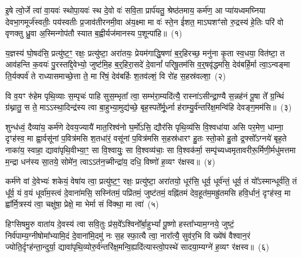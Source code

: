 \label{sec:startkanda1}
\setcounter{anuvakam}{0}
इ॒षे त्वो॒र्जे त्वा॑ वा॒यवः॑ स्थोपा॒यवः॑ स्थ दे॒वो वः॑ सवि॒ता प्रार्प॑यतु॒ श्रेष्ठ॑तमाय॒ कर्म॑ण॒ आ प्या॑यध्वमघ्निया देवभा॒गमूर्ज॑स्वतीः॒ पय॑स्वतीः प्र॒जाव॑तीरनमी॒वा अ॑य॒क्ष्मा मा वः॑ स्ते॒न ई॑शत॒ मा\-ऽघशꣳ॑सो रु॒द्रस्य॑ हे॒तिः परि॑ वो वृणक्तु ध्रु॒वा अ॒स्मिन्गोप॑तौ स्यात ब॒ह्वीर्यज॑मानस्य प॒शून्पा॑हि॥~(१)\ip

{\anuvakamend[{इ॒षे त्रिच॑त्वारिꣳशत्}]}

य॒ज्ञस्य॑ घो॒षद॑सि॒ प्रत्यु॑ष्ट॒ꣳ॒ रक्षः॒ प्रत्यु॑ष्टा॒ अरा॑तयः॒ प्रेयम॑गाद्धि॒षणा॑ ब॒र्॒हिरच्छ॒ मनु॑ना कृ॒ता स्व॒धया॒ वित॑ष्टा॒ त आव॑हन्ति क॒वयः॑ पु॒रस्ता᳚द्दे॒वेभ्यो॒ जुष्ट॑मि॒ह ब॒र्॒हिरा॒सदे॑ दे॒वानां᳚ परिषू॒तम॑सि व॒र्॒षवृ॑द्धमसि॒ देव॑बर्\mbox{}हि॒र्मा त्वा॒\-ऽन्वङ्मा ति॒र्यक्पर्व॑ ते राध्यासमाच्छे॒त्ता ते॒ मा रि॑षं॒ देव॑बर्\mbox{}हिः श॒तव॑ल्\mbox{}शं॒ वि रो॑ह स॒हस्र॑वल्\mbox{}शा॒~(२)\ip

वि व॒यꣳ रु॑हेम पृथि॒व्याः स॒म्पृचः॑ पाहि सुस॒म्भृता᳚ त्वा॒ सम्भ॑रा॒म्यदि॑त्यै॒ रास्ना॑\-ऽसीन्द्रा॒ण्यै स॒न्नह॑नं पू॒षा ते᳚ ग्र॒न्थिं ग्र॑थ्नातु॒ स ते॒ मा\-ऽऽ\-स्था॒दिन्द्र॑स्य त्वा बा॒हुभ्या॒मुद्य॑च्छे॒ बृह॒स्पते᳚र्मू॒र्ध्ना ह॑राम्यु॒र्व॑न्तरि॑क्ष॒मन्वि॑हि देवङ्ग॒मम॑सि॥~(३)\ip

{\anuvakamend[{स॒हस्र॑वल्\mbox{}शा अ॒ष्टात्रिꣳ॑शच्च}]}

शुन्ध॑ध्वं॒ दैव्या॑य॒ कर्म॑णे देवय॒ज्यायै॑ मात॒रिश्व॑नो घ॒र्मो॑\-ऽसि॒ द्यौर॑सि पृथि॒व्य॑सि वि॒श्वधा॑या असि पर॒मेण॒ धाम्ना॒ दृꣳह॑स्व॒ मा ह्वा॒र्वसू॑नां प॒वित्र॑मसि श॒तधा॑रं॒ वसू॑नां प॒वित्र॑मसि स॒हस्र॑धारꣳ हु॒तः स्तो॒को हु॒तो द्र॒फ्सो᳚\-ऽग्नये॑ बृह॒ते नाका॑य॒ स्वाहा॒ द्यावा॑\-पृथि॒वीभ्या॒ꣳ॒ सा वि॒श्वायुः॒ सा वि॒श्वव्य॑चाः॒ सा वि॒श्वक॑र्मा॒ सम्पृ॑च्यध्वमृतावरीरू॒र्मिणी॒र्मधु॑मत्तमा म॒न्द्रा धन॑स्य सा॒तये॒ सोमे॑न॒ त्वा\-ऽऽ\-त॑न॒च्मीन्द्रा॑य॒ दधि॒ विष्णो॑ ह॒व्यꣳ र॑क्षस्व॥~(४)\ip

{\anuvakamend[{सोमे॑ना॒ष्टौ च॑}]}

कर्म॑णे वां दे॒वेभ्यः॑ शकेयं॒ वेषा॑य त्वा॒ प्रत्यु॑ष्ट॒ꣳ॒ रक्षः॒ प्रत्यु॑ष्टा॒ अरा॑तयो॒ धूर॑सि॒ धूर्व॒ धूर्व॑न्तं॒ धूर्व॒ तं यो᳚\-ऽस्मान्धूर्व॑ति॒ तं धू᳚र्व॒ यं व॒यं धूर्वा॑म॒स्त्वं दे॒वाना॑मसि॒ सस्नि॑तमं॒ पप्रि॑तमं॒ जुष्ट॑तमं॒ वह्नि॑तमं देव॒हूत॑म॒मह्रु॑तमसि हवि॒र्धानं॒ दृꣳह॑स्व॒ मा ह्वा᳚र्मि॒त्रस्य॑ त्वा॒ चक्षु॑षा॒ प्रेक्षे॒ मा भेर्मा सं वि॑क्था॒ मा त्वा॑~(५)\ip

हिꣳसिषमु॒रु वाता॑य दे॒वस्य॑ त्वा सवि॒तुः प्र॑स॒वे᳚\-ऽश्विनो᳚र्बा॒हु\-भ्यां᳚ पू॒ष्णो हस्ता᳚भ्याम॒ग्नये॒ जुष्टं॒ निर्व॑पाम्य॒ग्नी\-षोमा᳚भ्यामि॒दं दे॒वाना॑मि॒दमु॑ नः स॒ह स्फा॒त्यै त्वा॒ नारा᳚त्यै॒ सुव॑र॒भि वि ख्ये॑षं वैश्वान॒रं ज्योति॒र्दृꣳह॑न्ता॒न्दुर्या॒ द्यावा॑\-पृथि॒व्योरु॒र्व॑न्तरि॑क्ष॒\-मन्वि॒ह्यदि॑त्यास्त्वो॒\-पस्थे॑ सादया॒म्यग्ने॑ ह॒व्यꣳ र॑क्षस्व॥~(६)\ip

